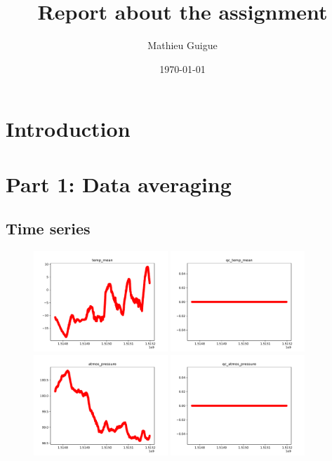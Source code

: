 \documentclass[11pt]{amsart}
\title{Report about the assignment}
\author{Mathieu Guigue}
\date{\today}                                           %
\begin{document}
\maketitle

\section{Introduction}

\section{Part 1: Data averaging}
\subsection{Time series}

\begin{figure}
    \includegraphics[width=0.45\textwidth]{../plots/temp_mean.pdf}
    \includegraphics[width=0.45\textwidth]{../plots/qc_temp_mean.pdf}
    \includegraphics[width=0.45\textwidth]{../plots/atmos_pressure.pdf}
    \includegraphics[width=0.45\textwidth]{../plots/qc_atmos_pressure.pdf}

\end{figure}
\end{document}
